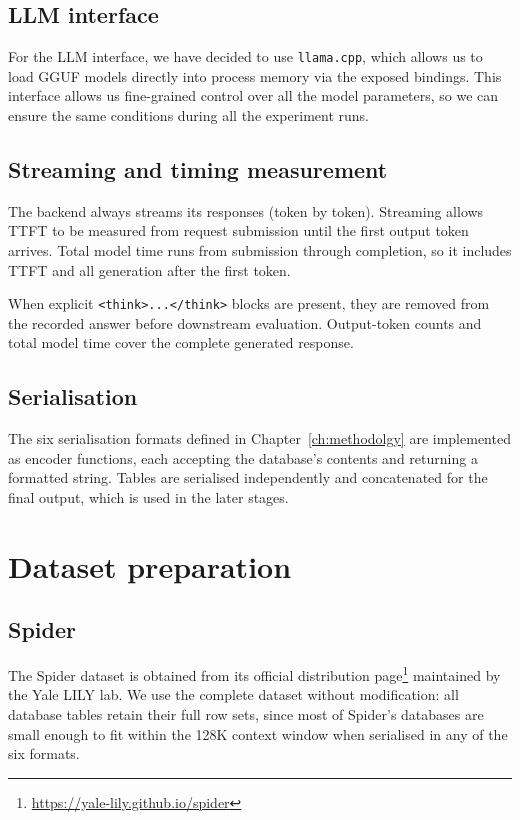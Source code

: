 \subsection{LLM interface}

For the LLM interface, we have decided to use \texttt{llama.cpp}, which allows us to load GGUF models
directly into process memory via the exposed bindings. This interface allows us fine-grained control over all
the model parameters, so we can ensure the same conditions during all the experiment runs.

\subsection{Streaming and timing measurement}

The backend always streams its responses (token by token). Streaming allows TTFT to be measured from request
submission until the first output token arrives. Total model time runs from submission through completion, so
it includes TTFT and all generation after the first token.

When explicit \texttt{<think>...</think>} blocks are present, they are removed from the recorded answer
before downstream evaluation. Output-token counts and total model time cover the complete generated response.

\subsection{Serialisation}

The six serialisation formats defined in Chapter~\ref{ch:methodolgy} are implemented as encoder functions,
each accepting the database's contents and returning a formatted string. Tables are serialised independently
and concatenated for the final output, which is used in the later stages.

\section{Dataset preparation}

\subsection{Spider}

The Spider dataset is obtained from its official distribution
page\footnote{\url{https://yale-lily.github.io/spider}} maintained by the Yale LILY lab. We use the complete
dataset without modification: all database tables retain their full row sets, since most of Spider's
databases are small enough to fit within the \num{128}K context window when serialised in any of the six formats.

